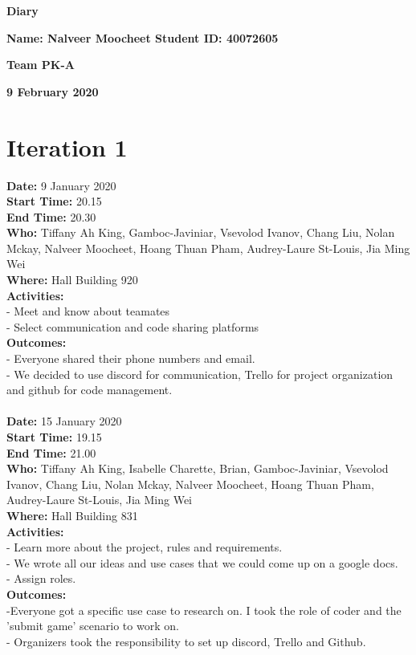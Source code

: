 \documentclass[12pt]{article}
\begin{document}
\vspace*{0.2in}
\centerline{\bf\Large Diary}

\vspace*{0.2in}
\centerline{\bf\Large Name: Nalveer Moocheet
Student ID: 40072605}

\vspace*{0.2in}
\centerline{\bf\Large Team PK-A}

\vspace*{0.2in}
\centerline{\bf\Large 9 February 2020}

\section{Iteration 1}

{\bf Date:} 9 January 2020 \\
{\bf Start Time:} 20.15 \\
{\bf End Time:} 20.30 \\
{\bf Who:} Tiffany Ah King, Gamboc-Javiniar, Vsevolod Ivanov, Chang Liu, Nolan Mckay, Nalveer Moocheet, Hoang Thuan Pham, Audrey-Laure St-Louis, Jia Ming Wei \\
{\bf Where:} Hall Building 920 \\
{\bf Activities:}\\
- Meet and know about teamates\\ - Select communication and code sharing platforms \\
{\bf Outcomes:} \\
- Everyone shared their phone numbers and email. \\
- We decided to use discord for communication, Trello for project organization and github for code management.
\\
\\
{\bf Date:} 15 January 2020 \\
{\bf Start Time:} 19.15 \\
{\bf End Time:} 21.00 \\
{\bf Who:} Tiffany Ah King, Isabelle Charette, Brian, Gamboc-Javiniar, Vsevolod Ivanov, Chang Liu, Nolan Mckay, Nalveer Moocheet, Hoang Thuan Pham, Audrey-Laure St-Louis, Jia Ming Wei \\
{\bf Where:} Hall Building 831 \\
{\bf Activities:}\\
- Learn more about the project, rules and requirements.\\
- We wrote all our ideas and use cases that we could come up on a google docs.\\
- Assign roles.\\ 
{\bf Outcomes:}\\
-Everyone got a specific use case to research on. I took the role of coder and  the 'submit game' scenario to work on. \\
- Organizers took the responsibility to set up discord, Trello and Github.\\
\end{document}
